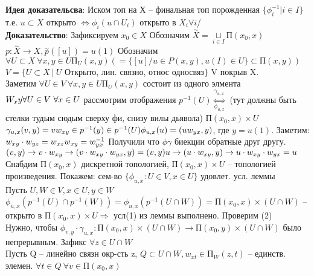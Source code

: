 	\textbf{Идея доказательсва}: Иском топ на Х -- финальная топ порожденная $\{\phi_{i}^{-1} | i\in I \}$ т.е. $u \subset X$ открыто $\Leftrightarrow \phi_i(u \cap U_i)$ открыто в $X_i \forall i$\slash \\
	\textbf{Доказательство}: Зафиксируем $x_0 \in X$ Обозначим $\overset{\sim}{X} = \underset{i\in I}{\sqcup}П(x_0, x) $\\
	$p: \overset{\sim}{X} \rightarrow X, \overset{\sim}{p}([u]) = u(1)$ Обозначим $\forall U \subset X\ \forall x,y \in U П_U(x,y) ( = \{[u] \slash  u\in P(x,y), u(I) \in U\} \subset П(x,y))$\\
	$V = \{U \subset X\ |\ U$ Открыто, лин. связно, относ односвяз$\}$ V покрыв X.\\
	Заметим $\forall U\in V\ \forall x,y \in U П_U(x,y)$ состоит из одного элмента $W_xy\\
	\forall U \in V\ \forall x\in U$ рассмотрим отображения $p^{-1}(U) \underset{\phi_{u,x}}{\overset{\gamma_{u,x}}{\Leftrightarrow}}$ (тут должны быть стелки тудым сюдым сверху фи, снизу вилы дьявола) $П(x_0, x) \times U$\\
	$\gamma_{u,x}(v,y) = vw_{xy} \in p^{-1}(y) \in p^{-1}(U)\\
	\phi_{u,x}(u) = (uw_{yx} , y)$, где $y = u(1)$. Заметим:\\
	$w_{xy} \cdot w_{yz} = w_{xz}\\
	w_{xy} = w^{-1}_{yx}$ Получили что $\phi \gamma$ биекции обратные друг другу.\\
	$(v,y) \rightarrow v\cdot w_{xy} \rightarrow (v\cdot w_{xy} \cdot w_{yx}, y) = (v,y)\\
	u \rightarrow (u\cdot w_{xy}, y) \rightarrow u\cdot w_{xy}\cdot w_{yx} = u$\\
	Снабдим $П(x_0, x)$ дискретной топологией, $П(x_0, x) \times U$ -- топологией произведения. Покажем: сем-во $\{\phi_{u,x}: U\in V, x\in U \}$ удовлет. усл. леммы\\
	Пусть $U,W \in V, x\in U, y\in W$\\
	$\phi_{u,x}(p^{-1}(U) \cap p^{-1}(W) ) = \phi_{u,x}(p^{-1}(U \cap W)) = П(x_0, x)\times (U \cap W)$ -- открыто в $П(x_0, x)\times U \Rightarrow$ усл(1) из леммы выполнено. Проверим (2)\\ 
	Нужно, чтобы $\phi_{v,y} \cdot \gamma_{u,x}: П(x_0, x)\times (U \cap W) \rightarrow П(x_0, y) \times (U \cap W)$ было непрерывным. Зафикс $\forall z\in U \cap W$\\
	Пусть Q -- линейно связн окр-сть z, $Q \subset U \cap W, w_{xt} \in П_W(z,t)$ -- единств. элемен. $\forall t \in Q\ \forall v\in П(x_0, x)$\\
